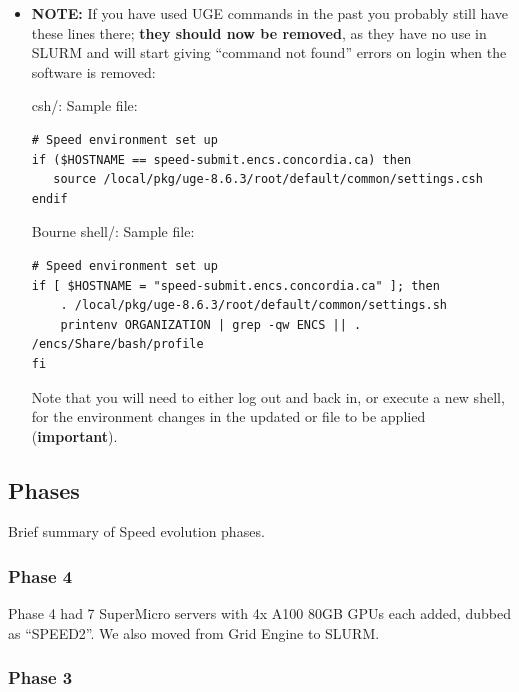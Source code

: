 \documentclass{easychair}
\begin{document}
\begin{itemize}
\item
\noindent
\textbf{NOTE:} If you have used UGE commands in the past you probably still have these
lines there; \textbf{they should now be removed}, as they have no use in SLURM and
will start giving ``command not found'' errors on login when the software is removed:

csh/:
Sample  file:
\begin{verbatim}
# Speed environment set up 
if ($HOSTNAME == speed-submit.encs.concordia.ca) then
   source /local/pkg/uge-8.6.3/root/default/common/settings.csh
endif
\end{verbatim}

Bourne shell/:
Sample  file:
\begin{verbatim}
# Speed environment set up 
if [ $HOSTNAME = "speed-submit.encs.concordia.ca" ]; then
    . /local/pkg/uge-8.6.3/root/default/common/settings.sh
    printenv ORGANIZATION | grep -qw ENCS || . /encs/Share/bash/profile
fi
\end{verbatim}

Note that you will need to either log out and back in, or execute a new shell, 
for the environment changes in the updated  or  file to be applied 
(\textbf{important}).


\end{itemize}

\subsection{Phases}
\label{sect:phases}

Brief summary of Speed evolution phases.

\subsubsection{Phase 4}

Phase 4 had 7 SuperMicro servers with 4x A100 80GB GPUs each added,
dubbed as ``SPEED2''. We also moved from Grid Engine to SLURM.

\subsubsection{Phase 3}
\end{document}
